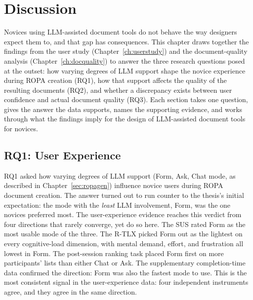 \chapter{Discussion}
\label{ch:discussion}

Novices using LLM-assisted document tools do not behave the
way designers expect them to, and that gap has consequences.
This chapter draws together the findings from the user study
(Chapter~\ref{ch:userstudy}) and the document-quality analysis
(Chapter~\ref{ch:docquality}) to answer the three research
questions posed at the outset: how varying degrees of LLM
support shape the novice experience during ROPA creation
(RQ1), how that support affects the quality of the resulting
documents (RQ2), and whether a discrepancy exists between user
confidence and actual document quality (RQ3). Each section
takes one question, gives the answer the data supports, names
the supporting evidence, and works through what the findings
imply for the design of LLM-assisted document tools for
novices.


\section{RQ1: User Experience}
\label{sec:disc-rq1}

RQ1 asked how varying degrees of LLM support (Form, Ask, Chat mode,
as described in Chapter~\ref{sec:ropagen}) influence novice
users during ROPA document creation. The answer turned out to
run counter to the thesis's initial expectation: the mode with
the \emph{least} LLM involvement, Form, was the one novices
preferred most. The user-experience evidence reaches this verdict
from four directions that rarely converge, yet do so here.
The SUS rated Form as the most usable mode
of the three. The R-TLX picked Form out as the lightest on every
cognitive-load dimension, with mental demand, effort, and
frustration all lowest in Form. The post-session ranking task
placed Form first on more participants' lists than either Chat
or Ask. The supplementary completion-time data confirmed the
direction: Form was also the fastest mode to use.
This is the most consistent signal in the user-experience data:
four independent instruments agree, and they agree in the same direction.

